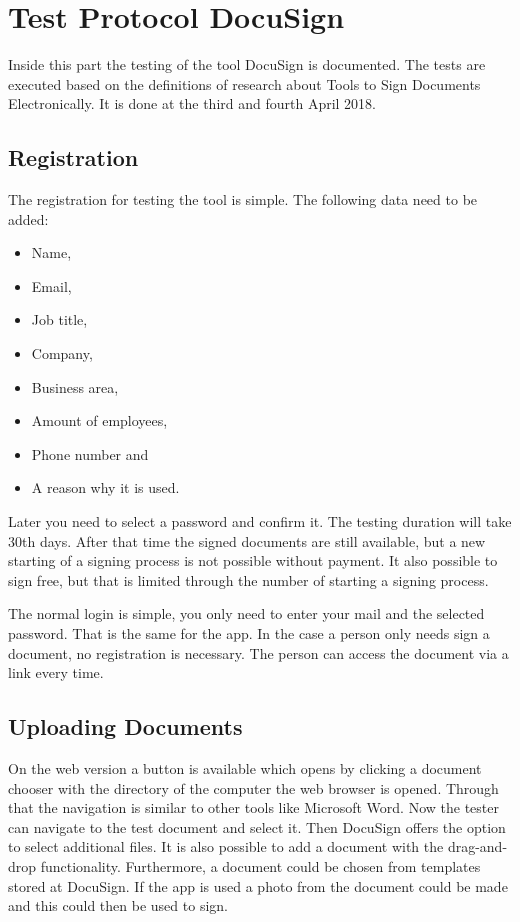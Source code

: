 \section{Test Protocol DocuSign} \label{tool:sec:docusign}
Inside this part the testing of the tool DocuSign is documented. The tests are executed based on the definitions of research about Tools to Sign Documents Electronically. It is done at the third and fourth April 2018. 

\subsection{Registration}
The registration for testing the tool is simple. The following data need to be added:
\begin{itemize}
	\item Name,
	\item Email,
	\item Job title,
	\item Company,
	\item Business area,
	\item Amount of employees,
	\item Phone number and
	\item A reason why it is used.
\end{itemize}
Later you need to select a password and confirm it. The testing duration will take 30th days. After that time the signed documents are still available, but a new starting of a signing process is not possible without payment. It also possible to sign free, but that is limited through the number of starting a signing process. 

The normal login is simple, you only need to enter your mail and the selected password. That is the same for the \gls{app}. In the case a person only needs sign a document, no registration is necessary. The person can access the document via a link every time.

\subsection{Uploading Documents}
On the web version a button is available which opens by clicking a document chooser with the directory of the computer the web browser is opened. Through that the navigation is similar to other tools like Microsoft Word. Now the tester can navigate to the test document and select it. Then DocuSign offers the option to select additional files. It is also possible to add a document with the drag-and-drop functionality. Furthermore, a document could be chosen from templates stored at DocuSign. If the \gls{app} is used a photo from the document could be made and this could then be used to sign.


